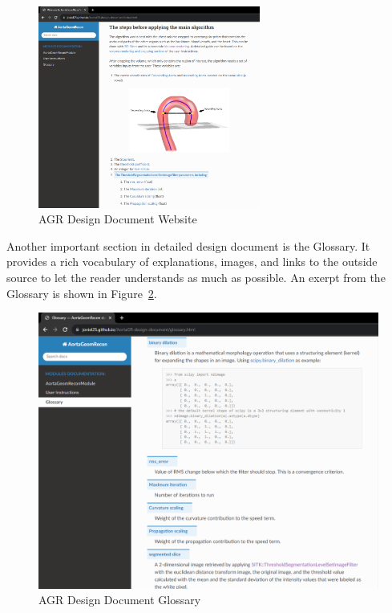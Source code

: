 \begin{figure}[H]
    \centering
    \includegraphics[width=0.65\textwidth]{figures/AC/DD/Main_page.png}
    \caption[AGR Design Document Website]{AGR Design Document Website}
    \label{fig_agr_dd}
\end{figure}

Another important section in detailed design document is the Glossary. It provides a rich vocabulary of explanations, images, and links to the outside source to let the reader understands as much as possible. An exerpt from the Glossary is shown in Figure~\ref{fig_agr_dd_glossary}.

\begin{figure}[H]
    \centering
    \includegraphics[width=\textwidth]{figures/AC/DD/Glossary.png}
    \caption[AGR Design Document Glossary]{AGR Design Document Glossary}
    \label{fig_agr_dd_glossary}
\end{figure}


